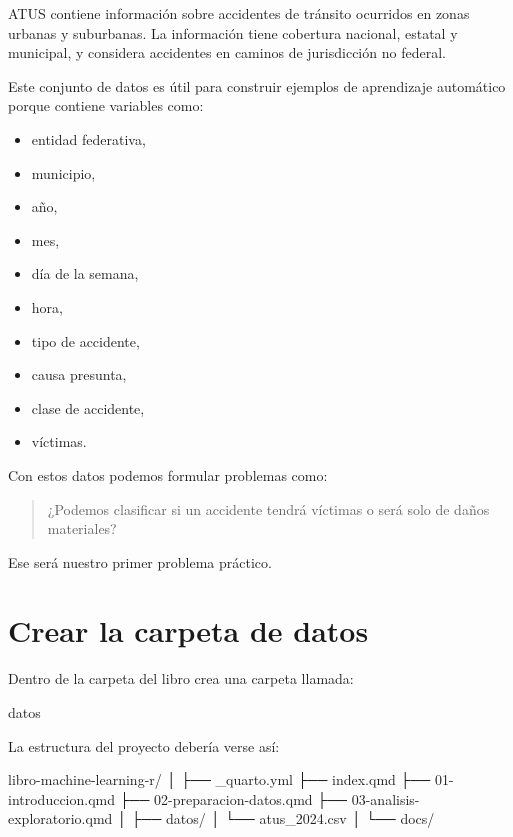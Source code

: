 \documentclass[
  11pt,
  letterpaper,
]{book}
\newenvironment{Shaded}{\begin{snugshade}}{\end{snugshade}}
\newcommand{\NormalTok}[1]{\textcolor[rgb]{0.00,0.23,0.31}{#1}}
\providecommand{\tightlist}{%
  \setlength{\itemsep}{0pt}\setlength{\parskip}{0pt}}
\begin{document}
ATUS contiene información sobre accidentes de tránsito ocurridos en
zonas urbanas y suburbanas. La información tiene cobertura nacional,
estatal y municipal, y considera accidentes en caminos de jurisdicción
no federal.

Este conjunto de datos es útil para construir ejemplos de aprendizaje
automático porque contiene variables como:

\begin{itemize}
\tightlist
\item
  entidad federativa,
\item
  municipio,
\item
  año,
\item
  mes,
\item
  día de la semana,
\item
  hora,
\item
  tipo de accidente,
\item
  causa presunta,
\item
  clase de accidente,
\item
  víctimas.
\end{itemize}

Con estos datos podemos formular problemas como:

\begin{quote}
¿Podemos clasificar si un accidente tendrá víctimas o será solo de daños
materiales?
\end{quote}

Ese será nuestro primer problema práctico.

\section{Crear la carpeta de datos}\label{crear-la-carpeta-de-datos}

Dentro de la carpeta del libro crea una carpeta llamada:

\begin{Shaded}
\begin{Highlighting}[]
\NormalTok{datos}
\end{Highlighting}
\end{Shaded}

La estructura del proyecto debería verse así:

\begin{Shaded}
\begin{Highlighting}[]
\NormalTok{libro{-}machine{-}learning{-}r/}
\NormalTok{│}
\NormalTok{├── \_quarto.yml}
\NormalTok{├── index.qmd}
\NormalTok{├── 01{-}introduccion.qmd}
\NormalTok{├── 02{-}preparacion{-}datos.qmd}
\NormalTok{├── 03{-}analisis{-}exploratorio.qmd}
\NormalTok{│}
\NormalTok{├── datos/}
\NormalTok{│   └── atus\_2024.csv}
\NormalTok{│}
\NormalTok{└── docs/}
\end{Highlighting}
\end{Shaded}
\end{document}
